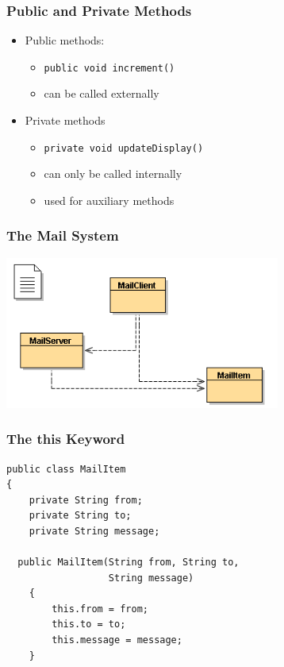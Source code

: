 \documentclass{beamer}
\begin{document}
\begin{frame}[fragile]
\frametitle{Public and Private Methods}
\begin{itemize}
\item Public methods:
\begin{itemize}
\item \lstinline!public void increment()‏!
\item can be called externally
\end{itemize}
\item Private methods
\begin{itemize}
\item \lstinline!private void updateDisplay()‏!
\item can only be called internally
\item used for auxiliary methods 
\end{itemize}
\end{itemize}
\end{frame}

\begin{frame}
\frametitle{The Mail System}
\begin{center}
\includegraphics[height=5cm, keepaspectratio]{./figures/mailclass}
\end{center}
\end{frame}

\begin{frame}[fragile]
\frametitle{The this Keyword}
\begin{lstlisting}
public class MailItem
{
	private String from;
	private String to;
	private String message;

  public MailItem(String from, String to, 
                  String message)‏
    {
        this.from = from;
        this.to = to;
        this.message = message;
    }
\end{lstlisting}
\end{frame}
\end{document}
